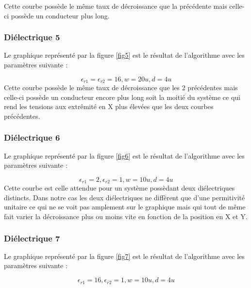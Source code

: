 Cette courbe possède le même taux de décroissance que la précédente mais celle-ci possède un conducteur plus long.

\subsubsection{Diélectrique 5}
Le graphique représenté par la figure \ref{fig5} est le résultat de l'algorithme avec les paramètres suivante : 

\begin{displaymath}
\epsilon_{r1} = \epsilon_{r2} = 16, w= 20 u, d = 4 u
\end{displaymath}
Cette courbe possède le même taux de décroissance que les 2 précédentes mais celle-ci possède un conducteur encore plus long soit la moitié du système ce qui rend les tensions aux extrêmité en X plus élevées que les deux courbes précédentes.

\subsubsection{Diélectrique 6}
Le graphique représenté par la figure \ref{fig6} est le résultat de l'algorithme avec les paramètres suivante : 

\begin{displaymath}
\epsilon_{r1} = 2, \epsilon_{r2} = 1, w= 10 u, d = 4 u
\end{displaymath}
Cette courbe est celle attendue pour un système possèdant deux diélectriques distincts. Dans notre cas les deux diélectriques ne diffèrent que d'une permitivité unitaire ce qui ne se voit pas amplement sur le graphique mais qui tout de même fait varier la décroissance plus ou moins vite en fonction de la position en X et Y.

\subsubsection{Diélectrique 7}
Le graphique représenté par la figure \ref{fig7} est le résultat de l'algorithme avec les paramètres suivante : 

\begin{displaymath}
\epsilon_{r1} = 16, \epsilon_{r2} = 1, w= 10 u, d = 4 u
\end{displaymath}

